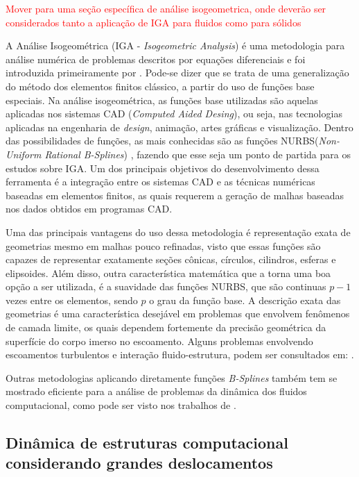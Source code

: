 \documentclass[tese_patricia.tex]{subfiles}
\begin{document}
\textcolor{red}{Mover para uma seção específica de análise isogeometrica, onde deverão ser considerados tanto a aplicação de IGA para fluidos como para sólidos}

{\color{green}
A Análise Isogeométrica (IGA - \textit{Isogeometric Analysis}) é uma metodologia para análise numérica de problemas descritos por equações diferenciais e foi introduzida primeiramente por . Pode-se dizer que se trata de uma generalização do método dos elementos finitos clássico, a partir do uso de funções base especiais. Na análise isogeométrica, as funções base utilizadas são aquelas aplicadas nos sistemas CAD (\textit{Computed Aided Desing}), ou seja, nas tecnologias aplicadas na engenharia de \textit{design}, animação, artes gráficas e visualização.  Dentro das possibilidades de funções, as mais conhecidas são as funções NURBS(\textit{Non-Uniform Rational B-Splines}) \cite{PiegT:1996}, fazendo que esse seja um ponto de partida para os estudos sobre IGA. Um dos principais objetivos do desenvolvimento dessa ferramenta é a integração entre os sistemas CAD e as técnicas numéricas baseadas em elementos finitos, as quais requerem a geração de malhas baseadas nos dados obtidos em programas CAD. 

Uma das principais vantagens do uso dessa metodologia é representação exata de geometrias mesmo em malhas pouco refinadas, visto que essas funções são capazes de representar exatamente seções cônicas, círculos, cilindros, esferas e elipsoides. Além disso, outra característica matemática que a torna uma boa opção a ser utilizada, é a suavidade das funções NURBS, que são continuas $p-1$ vezes entre os elementos, sendo $p$ o grau da função base. A descrição exata das geometrias é uma característica desejável em problemas que envolvem fenômenos de camada limite, os quais dependem fortemente da precisão geométrica da superfície do corpo imerso no escoamento. Alguns problemas envolvendo escoamentos turbulentos e interação fluido-estrutura, podem ser consultados em: .

Outras metodologias aplicando diretamente funções \textit{B-Splines} também tem se mostrado eficiente para a análise de problemas da dinâmica dos fluidos computacional, como pode ser visto nos trabalhos de .}


\subsection{Dinâmica de estruturas computacional considerando grandes deslocamentos}
\label{csdsection}
\end{document}
